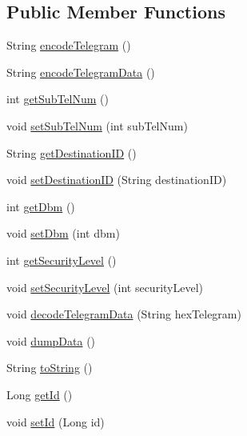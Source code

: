 \subsection*{Public Member Functions}
\begin{DoxyCompactItemize}
\item 
String \hyperlink{classch_1_1bfh_1_1gr33nopo55um_1_1enocean_1_1telegram_1_1_radio_e_r_p1_a57f766be286585c2246368c8da69a6e5}{encode\+Telegram} ()
\item 
String \hyperlink{classch_1_1bfh_1_1gr33nopo55um_1_1enocean_1_1telegram_1_1_radio_e_r_p1_ac3eaf30bab4d3aeed647ca881cca3330}{encode\+Telegram\+Data} ()
\item 
int \hyperlink{classch_1_1bfh_1_1gr33nopo55um_1_1enocean_1_1telegram_1_1_radio_e_r_p1_a763925119b29245f036f6c08aa1fa76a}{get\+Sub\+Tel\+Num} ()
\item 
void \hyperlink{classch_1_1bfh_1_1gr33nopo55um_1_1enocean_1_1telegram_1_1_radio_e_r_p1_ada5a90f519ee57c5b7eb34d864cace46}{set\+Sub\+Tel\+Num} (int sub\+Tel\+Num)
\item 
String \hyperlink{classch_1_1bfh_1_1gr33nopo55um_1_1enocean_1_1telegram_1_1_radio_e_r_p1_a0f1534f6cdb2364b9dac0834c8503133}{get\+Destination\+ID} ()
\item 
void \hyperlink{classch_1_1bfh_1_1gr33nopo55um_1_1enocean_1_1telegram_1_1_radio_e_r_p1_a0f47c2e77f972329c7b54331e4aeae8f}{set\+Destination\+ID} (String destination\+ID)
\item 
int \hyperlink{classch_1_1bfh_1_1gr33nopo55um_1_1enocean_1_1telegram_1_1_radio_e_r_p1_ae3b96a579a0a10e4ac1648a738fffe76}{get\+Dbm} ()
\item 
void \hyperlink{classch_1_1bfh_1_1gr33nopo55um_1_1enocean_1_1telegram_1_1_radio_e_r_p1_acd963069f912a91f1515058d282431cb}{set\+Dbm} (int dbm)
\item 
int \hyperlink{classch_1_1bfh_1_1gr33nopo55um_1_1enocean_1_1telegram_1_1_radio_e_r_p1_a62ea5e0cbcdc31fb0ab542ffe2c7e603}{get\+Security\+Level} ()
\item 
void \hyperlink{classch_1_1bfh_1_1gr33nopo55um_1_1enocean_1_1telegram_1_1_radio_e_r_p1_ab1e2f78109a2aaf4c0df4b75ffd83fee}{set\+Security\+Level} (int security\+Level)
\item 
void \hyperlink{classch_1_1bfh_1_1gr33nopo55um_1_1enocean_1_1telegram_1_1_radio_e_r_p1_acbd663f1c594bc3f8459d2e2ffb53e52}{decode\+Telegram\+Data} (String hex\+Telegram)
\item 
void \hyperlink{classch_1_1bfh_1_1gr33nopo55um_1_1enocean_1_1telegram_1_1_radio_e_r_p1_aa6250ff9185e92c1254fbade5a6f62c6}{dump\+Data} ()
\item 
String \hyperlink{classch_1_1bfh_1_1gr33nopo55um_1_1enocean_1_1telegram_1_1_radio_e_r_p1_ab94adfea73a72479616a8e862c353c11}{to\+String} ()
\item 
Long \hyperlink{classch_1_1bfh_1_1gr33nopo55um_1_1enocean_1_1telegram_1_1_radio_e_r_p1_ad571009a5372ca4a89cb52e089e9fbe7}{get\+Id} ()
\item 
void \hyperlink{classch_1_1bfh_1_1gr33nopo55um_1_1enocean_1_1telegram_1_1_radio_e_r_p1_a925fa5e656cbb47eab8277be09a25d5b}{set\+Id} (Long id)
\end{DoxyCompactItemize}


